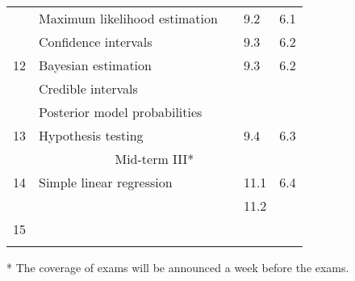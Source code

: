 \documentclass[10pt]{article}
\begin{document}
\begin{center}
\begin{tabular}{|l|l|l|l|l|}
& Maximum likelihood estimation &  & 9.2 & 6.1 \\
& Confidence intervals &  & 9.3 & 6.2\\
\hline
12 & Bayesian estimation &  & 9.3 & 6.2\\
& Credible intervals & & & \\
& Posterior model probabilities & & & \\
\hline
13 & Hypothesis testing &  & 9.4 & 6.3 \\
\hline
\hline
\multicolumn{5}{|c|}{Mid-term III*} \\
\hline
\hline
14 & Simple linear regression &  & 11.1 & 6.4 \\
& &  & 11.2 & \\
\hline
15 & &&& \\
& & & & \\
\hline
\end{tabular}
\end{center}

* The coverage of exams will be announced a week before the exams.
\end{document}

